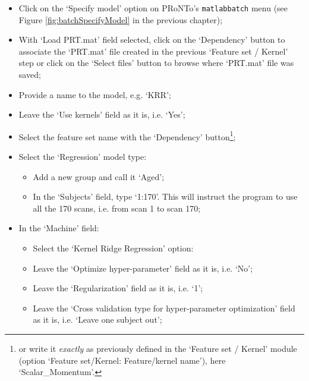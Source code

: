 \begin{itemize}

\item Click on the `Specify model' option on PRoNTo's {\tt matlabbatch} menu (see Figure \ref{fig:batchSpecifyModel} in the previous chapter);

\item With `Load PRT.mat' field selected, click on the `Dependency' button to associate the `PRT.mat' file created in the previous `Feature set / Kernel' step or click on the `Select files' button to browse where `PRT.mat' file was saved;

\item Provide a name to the model, e.g. `KRR';   

\item Leave the `Use kernels' field as it is, i.e. `Yes';    

\item Select the feature set name with the `Dependency' button\footnote{or write it {\it exactly} as previously defined in the `Feature set / Kernel' module (option `Feature set/Kernel: Feature/kernel name'), here `Scalar\_Momentum'.};    
    
\item Select the `Regression' model type:

    \begin{itemize}
    
    \item Add a new group and call it `Aged';
    
    \item In the `Subjects' field, type `1:170'. This will instruct the program to use all the 170 scans, i.e. from scan 1 to scan 170;
       
    \end{itemize}
    
    \item In the `Machine' field: 
    
    \begin{itemize}

   \item Select the `Kernel Ridge Regression' option:
       
	\item Leave the `Optimize hyper-parameter' field as it is, i.e. `No';
	
	\item Leave the `Regularization' field as it is, i.e. `1';
	
	\item Leave the `Cross validation type for hyper-parameter optimization' field as it is, i.e. `Leave one subject out';    


\end{itemize}
\end{itemize}
